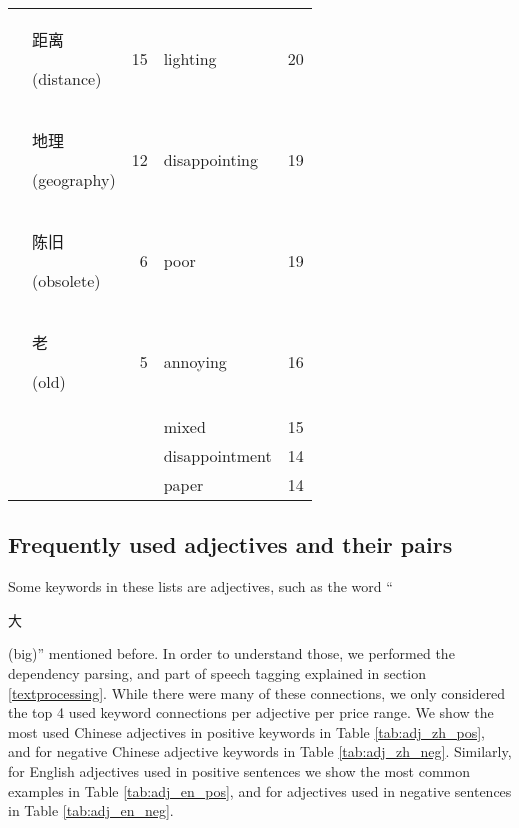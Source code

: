 \documentclass[smallextended,natbib]{svjour3}       %
\begin{document}
\begin{table}[ht]
{\begin{tabular}{|c|lr|lr|}
                                                             & \begin{CJK}{UTF8}{gbsn}距离\end{CJK} (distance)  & 15   & lighting       & 20  \\  
                                                             & \begin{CJK}{UTF8}{gbsn}地理\end{CJK} (geography) & 12   & disappointing  & 19  \\  
                                                             & \begin{CJK}{UTF8}{gbsn}陈旧\end{CJK} (obsolete)  & 6    & poor           & 19  \\  
                                                             & \begin{CJK}{UTF8}{gbsn}老\end{CJK} (old)        & 5    & annoying       & 16  \\  
                                                             &                                                &      & mixed          & 15  \\  
                                                             &                                                &      & disappointment & 14  \\  
                                                             &                                                &      & paper          & 14  \\ \hline
        \end{tabular}%
        }
    \end{table}

  \subsection{Frequently used adjectives and their pairs}\label{adjresults}

    Some keywords in these lists are adjectives, such as the word ``\begin{CJK}{UTF8}{gbsn}大\end{CJK} (big)'' mentioned before. In order to understand those, we performed the dependency parsing, and part of speech tagging explained in section \ref{textprocessing}. While there were many of these connections, we only considered the top 4 used keyword connections per adjective per price range. We show the most used Chinese adjectives in positive keywords in Table \ref{tab:adj_zh_pos}, and for negative Chinese adjective keywords in Table \ref{tab:adj_zh_neg}. Similarly, for English adjectives used in positive sentences we show the most common examples in Table \ref{tab:adj_en_pos}, and for adjectives used in negative sentences in Table \ref{tab:adj_en_neg}.
\end{document}
